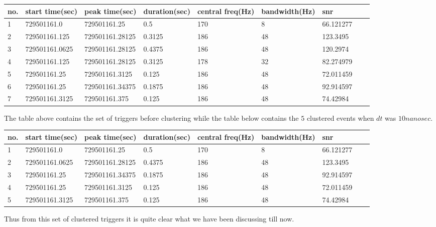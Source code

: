 \begin{tabular}{||l|l|l|l|l|l|l|lr||} \hline
no. & start time(sec) & peak time(sec) & duration(sec) & central freq(Hz) & bandwidth(Hz) & snr \\ \hline
1 &729501161.0  & 729501161.25  & 0.5     & 170  & 8   & 66.121277 \\ \hline
2 &729501161.125  & 729501161.28125  & 0.3125  & 186  & 48  & 123.3495 \\ \hline
3 &729501161.0625  & 729501161.28125  & 0.4375  & 186  & 48  & 120.2974 \\ \hline
4 &729501161.125 &729501161.28125 &0.3125 &178 &32 &82.274979 \\ \hline
5 &729501161.25 &729501161.3125 &0.125 &186 &48 &72.011459  \\ \hline
6 &729501161.25 &729501161.34375 &0.1875 &186 &48 & 92.914597 \\ \hline
7 &729501161.3125 &729501161.375 &0.125 & 186 &48 & 74.42984 \\ \hline
\end{tabular}

\vspace{0.1 in} 

The table above contains the set of triggers before clustering while   
the table below contains the $5$ clustered events when $dt$ 
was $10 nanosec$.

\vspace{0.1 in}

\begin{tabular}{||l|l|l|l|l|l|l|lr||} \hline
no. & start time(sec) & peak time(sec) & duration(sec) & central freq(Hz) & bandwidth(Hz) & snr \\ \hline
1 &729501161.0 &729501161.25 &0.5 &170 &8 & 66.121277 \\ \hline
2 &729501161.0625 &729501161.28125 &0.4375 &186 &48 &123.3495 \\ \hline
3 &729501161.25 &729501161.34375 &0.1875 &186 &48 &92.914597 \\ \hline
4 &729501161.25 &729501161.3125 &0.125 &186 &48 &72.011459 \\ \hline
5 &729501161.3125 &729501161.375 &0.125 &186 &48 &74.42984 \\ \hline 
\end{tabular}

\vspace{0.1 in}

Thus from this set of clustered triggers it is quite clear what we have been 
discussing till now.

